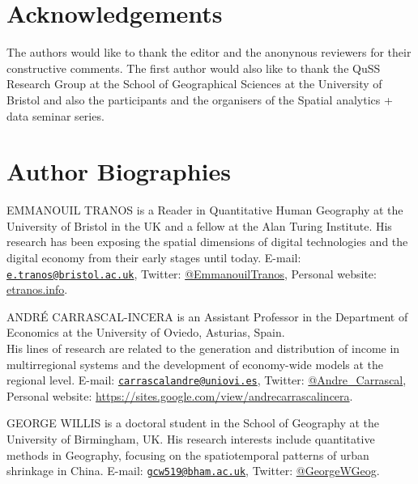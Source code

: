 \documentclass[]{interact}
\theoremstyle{plain}%
\theoremstyle{definition}
\theoremstyle{remark}
\begin{document}
\hypertarget{acknowledgements}{%
\section*{Acknowledgements}\label{acknowledgements}}

The authors would like to thank the editor and the anonynous reviewers
for their constructive comments. The first author would also like to
thank the QuSS Research Group at the School of Geographical Sciences at
the University of Bristol and also the participants and the organisers
of the Spatial analytics + data seminar series.

\hypertarget{author-biographies}{%
\section*{Author Biographies}\label{author-biographies}}

EMMANOUIL TRANOS is a Reader in Quantitative Human Geography at the
University of Bristol in the UK and a fellow at the Alan Turing
Institute. His research has been exposing the spatial dimensions of
digital technologies and the digital economy from their early stages
until today. E-mail:
\href{mailto:e.tranos@bristol.ac.uk}{\nolinkurl{e.tranos@bristol.ac.uk}},
Twitter: \href{https://twitter.com/EmmanouilTranos}{@EmmanouilTranos},
Personal website: \href{https://etranos.info/}{etranos.info}.

\bigskip

\noindent ANDRÉ CARRASCAL-INCERA is an Assistant Professor in the
Department of Economics at the University of Oviedo, Asturias, Spain.\\
His lines of research are related to the generation and distribution of
income in multirregional systems and the development of economy-wide
models at the regional level. E-mail:
\href{mailto:carrascalandre@uniovi.es}{\nolinkurl{carrascalandre@uniovi.es}},
Twitter: \href{https://twitter.com/Andre_Carrascal}{@Andre\_Carrascal},
Personal website:
\url{https://sites.google.com/view/andrecarrascalincera}.

\bigskip

\noindent GEORGE WILLIS is a doctoral student in the School of Geography
at the University of Birmingham, UK. His research interests include
quantitative methods in Geography, focusing on the spatiotemporal
patterns of urban shrinkage in China. E-mail:
\href{mailto:gcw519@bham.ac.uk}{\nolinkurl{gcw519@bham.ac.uk}}, Twitter:
\href{https://twitter.com/GeorgeWGeog}{@GeorgeWGeog}.



\end{document}
